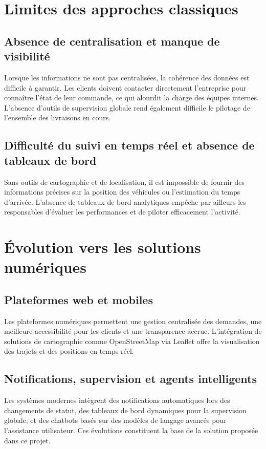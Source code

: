 \documentclass[12pt,a4paper,oneside]{report}
\begin{document}
\section{Limites des approches classiques}

\subsection{Absence de centralisation et manque de visibilité}
Lorsque les informations ne sont pas centralisées, la cohérence des données est difficile à garantir. Les clients doivent contacter directement l'entreprise pour connaître l'état de leur commande, ce qui alourdit la charge des équipes internes. L'absence d'outils de supervision globale rend également difficile le pilotage de l'ensemble des livraisons en cours.

\subsection{Difficulté du suivi en temps réel et absence de tableaux de bord}
Sans outils de cartographie et de localisation, il est impossible de fournir des informations précises sur la position des véhicules ou l'estimation du temps d'arrivée. L'absence de tableaux de bord analytiques empêche par ailleurs les responsables d'évaluer les performances et de piloter efficacement l'activité.

\section{Évolution vers les solutions numériques}

\subsection{Plateformes web et mobiles}
Les plateformes numériques permettent une gestion centralisée des demandes, une meilleure accessibilité pour les clients et une transparence accrue. L'intégration de solutions de cartographie comme OpenStreetMap via Leaflet offre la visualisation des trajets et des positions en temps réel.

\subsection{Notifications, supervision et agents intelligents}
Les systèmes modernes intègrent des notifications automatiques lors des changements de statut, des tableaux de bord dynamiques pour la supervision globale, et des chatbots basés sur des modèles de langage avancés pour l'assistance utilisateur. Ces évolutions constituent la base de la solution proposée dans ce projet.
\end{document}
